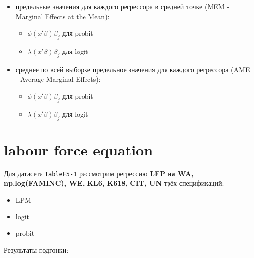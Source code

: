 \documentclass[
  russian,
]{article}
\providecommand{\tightlist}{%
  \setlength{\itemsep}{0pt}\setlength{\parskip}{0pt}}
\begin{document}
\begin{itemize}
\tightlist
\item
  предельные значения для каждого регрессора в средней точке (MEM -
  Marginal Effects at the Mean):

  \begin{itemize}
  \tightlist
  \item
    \(\phi(\bar{x}'\beta)\beta_j\) для probit
  \item
    \(\lambda(\bar{x}'\beta)\beta_j\) для logit
  \end{itemize}
\item
  среднее по всей выборке предельное значения для каждого регрессора
  (AME - Average Marginal Effects):

  \begin{itemize}
  \tightlist
  \item
    \(\overline{\phi(x'\beta)\beta_j}\) для probit
  \item
    \(\overline{\lambda(x'\beta)\beta_j}\) для logit
  \end{itemize}
\end{itemize}

\section{labour force equation}\label{labour-force-equation}

Для датасета \texttt{TableF5-1} рассмотрим регрессию \textbf{LFP на WA,
np.log(FAMINC), WE, KL6, K618, CIT, UN} трёх спецификаций:

\begin{itemize}
\tightlist
\item
  LPM
\item
  logit
\item
  probit
\end{itemize}

Результаты подгонки:
\end{document}
